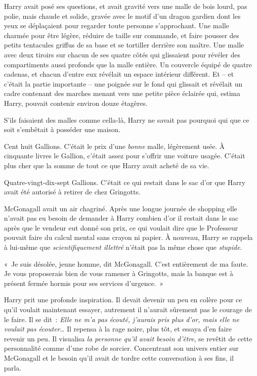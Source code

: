 Harry avait posé ses questions, et avait gravité vers une malle de bois lourd, pas polie, mais chaude et solide, gravée avec le motif d'un dragon gardien dont les yeux se déplaçaient pour regarder toute personne s'approchant. Une malle charmée pour être légère, réduire de taille sur commande, et faire pousser des petits tentacules griffus de sa base et se tortiller derrière son maître. Une malle avec deux tiroirs sur chacun de ses quatre côtés qui glissaient pour révéler des compartiments aussi profonds que la malle entière. Un couvercle équipé de quatre cadenas, et chacun d'entre eux révélait un espace intérieur différent. Et -- et c'était la partie importante -- une poignée sur le fond qui glissait et révélait un cadre contenant des marches menant vers une petite pièce éclairée qui, estima Harry, pouvait contenir environ douze étagères.

S'ils faisaient des malles comme cella-là, Harry ne savait pas pourquoi qui que ce soit s'embêtait à posséder une maison.

Cent huit Gallions. C'était le prix d'une \emph{bonne} malle, légèrement usée. À cinquante livres le Gallion, c'était assez pour s'offrir une voiture usagée. C'était plus cher que la somme de tout ce que Harry avait acheté de sa vie.

Quatre-vingt-dix-sept Gallions. C'était ce qui restait dans le sac d'or que Harry avait été autorisé à retirer de chez Gringotts.

McGonagall avait un air chagriné. Après une longue journée de shopping elle n'avait pas eu besoin de demander à Harry combien d'or il restait dans le sac après que le vendeur eut donné son prix, ce qui voulait dire que le Professeur pouvait faire du calcul mental sans crayon ni papier. À nouveau, Harry se rappela à lui-même que \emph{scientifiquement illettré} n'était pas la même chose que \emph{stupide}.

«~Je suis désolée, jeune homme, dit McGonagall. C'est entièrement de ma faute. Je vous proposerais bien de vous ramener à Gringotts, mais la banque est à présent fermée hormis pour ses services d'urgence.~»

Harry prit une profonde inspiration. Il devait devenir un peu en colère pour ce qu'il voulait maintenant essayer, autrement il n'aurait sûrement pas le courage de le faire. Il se dit~: \emph{Elle ne m'a pas écouté, j'aurais pris plus d'or, mais elle ne voulait pas écouter}… Il repensa à la rage noire, plus tôt, et essaya d'en faire revenir un peu. Il visualisa \emph{la personne qu'il avait besoin d'être}, se revêtit de cette personnalité comme d'une robe de sorcier. Concentrant son univers entier sur McGonagall et le besoin qu'il avait de tordre cette conversation à ses fins, il parla.

